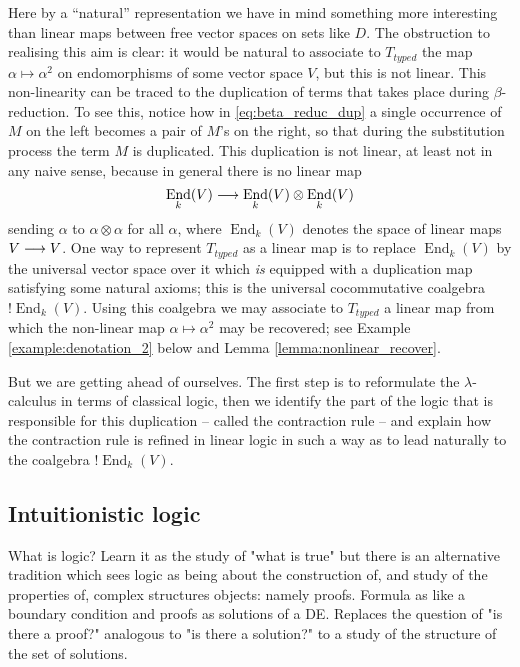 \documentclass[english,letter paper,12pt,reqno]{article}
\theoremstyle{example}
\numberwithin{equation}{section}
\DeclareMathOperator{\End}{End}
\begin{document}
Here by a ``natural'' representation we have in mind something more interesting than linear maps between free vector spaces on sets like $D$. The obstruction to realising this aim is clear: it would be natural to associate to $T_{typed}$ the map $\alpha \mapsto \alpha^2$ on endomorphisms of some vector space $V$, but this is not linear. This non-linearity can be traced to the duplication of terms that takes place during $\beta$-reduction. To see this, notice how in \eqref{eq:beta_reduc_dup} a single occurrence of $M$ on the left becomes a pair of $M$'s on the right, so that during the substitution process the term $M$ is duplicated. This duplication is not linear, at least not in any naive sense, because in general there is no linear map
\begin{equation}\label{eq:dup_map_end}
\End_k(V) \lto \End_k(V) \otimes \End_k(V)
\end{equation}
sending $\alpha$ to $\alpha \otimes \alpha$ for all $\alpha$, where $\End_k(V)$ denotes the space of linear maps $V \longrightarrow V$. One way to represent $T_{typed}$ as a linear map is to replace $\End_k(V)$ by the universal vector space over it which \emph{is} equipped with a duplication map satisfying some natural axioms; this is the universal cocommutative coalgebra ${!} \End_k(V)$. Using this coalgebra we may associate to $T_{typed}$ a linear map from which the non-linear map $\alpha \mapsto \alpha^2$ may be recovered; see Example \ref{example:denotation_2} below and Lemma \ref{lemma:nonlinear_recover}. %

But we are getting ahead of ourselves. The first step is to reformulate the $\lambda$-calculus in terms of classical logic, then we identify the part of the logic that is responsible for this duplication -- called the contraction rule -- and explain how the contraction rule is refined in linear logic in such a way as to lead naturally to the coalgebra ${!} \End_k(V)$.

\subsection{Intuitionistic logic}\label{section:intuit_logic}

What is logic? Learn it as the study of "what is true" but there is an alternative tradition which sees logic as being about the construction of, and study of the properties of, complex structures objects: namely proofs. Formula as like a boundary condition and proofs as solutions of a DE. Replaces the question of "is there a proof?" analogous to "is there a solution?" to a study of the structure of the set of solutions.
\end{document}

